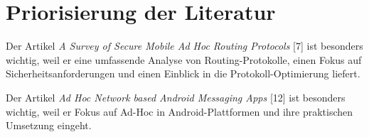 \chapter{Priorisierung der Literatur}\label{ch:data}

\label{sec:kurzdarstellung}
Der Artikel \textit{A Survey of Secure Mobile Ad Hoc Routing Protocols} [7] ist besonders wichtig, weil er eine 
umfassende Analyse von Routing-Protokolle, einen Fokus auf Sicherheitsanforderungen und 
einen Einblick in die Protokoll-Optimierung liefert.

Der Artikel \textit{Ad Hoc Network based Android Messaging Apps} [12] ist besonders wichtig, 
weil er Fokus auf Ad-Hoc in Android-Plattformen und ihre praktischen Umsetzung eingeht.
